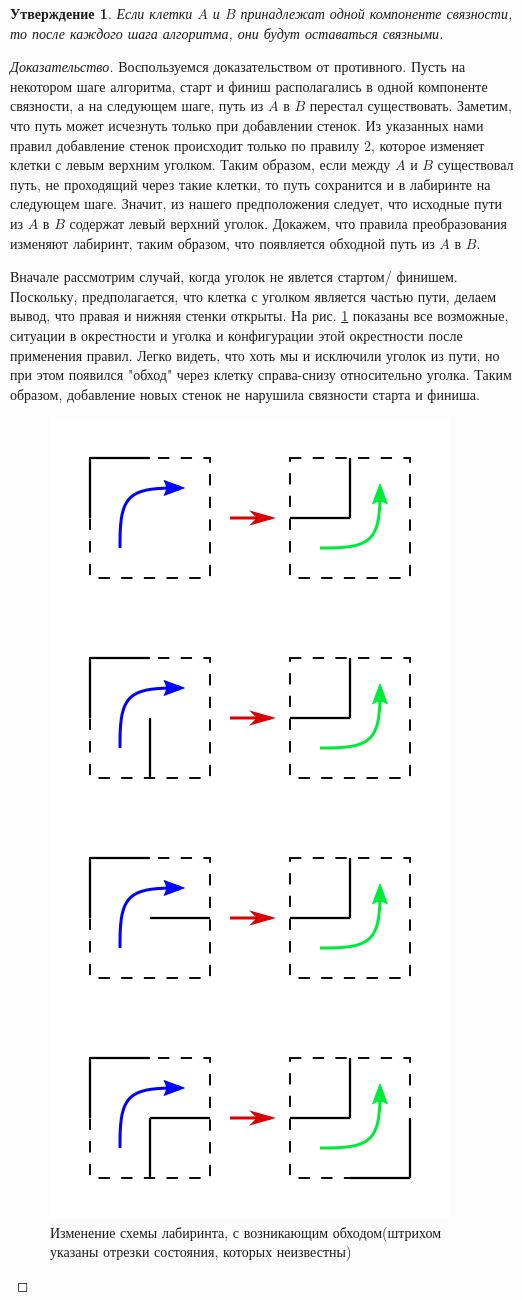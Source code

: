 \documentclass[12pt]{article}
\newtheorem*{claim*}{Утверждение}
\begin{document}
\begin{claim*}
	Если клетки $A$ и $B$ принадлежат одной компоненте связности, то после каждого шага алгоритма, они будут оставаться связными.
\end{claim*}
\begin{proof}[Доказательство]
	Воспользуемся доказательством от противного. Пусть на некотором шаге алгоритма, старт и финиш располагались в одной компоненте связности, а на следующем шаге, путь из $A$ в $B$ перестал существовать. Заметим, что путь может исчезнуть только при добавлении стенок. Из указанных нами правил добавление стенок происходит только по правилу $2$, которое изменяет клетки с левым верхним уголком. Таким образом, если между $A$ и $B$ существовал путь, не проходящий через такие клетки, то путь сохранится и в лабиринте на следующем шаге. Значит, из нашего предположения следует, что исходные пути из $A$ в $B$ содержат левый верхний уголок. Докажем, что правила преобразования изменяют лабиринт, таким образом, что появляется обходной путь из $A$ в $B$.
	
	\bigskip
	
	Вначале рассмотрим случай, когда уголок не явлется стартом/ финишем. Поскольку, предполагается, что клетка с уголком является частью пути, делаем вывод, что правая и нижняя стенки открыты. На рис. \ref{fig:alt_way} показаны все возможные, ситуации в окрестности и уголка и конфигурации этой окрестности после применения правил. Легко видеть, что хоть мы и исключили уголок из пути, но при этом появился "обход" через клетку справа-снизу относительно уголка. Таким образом, добавление новых стенок не нарушила связности старта и финиша.
	
	\begin{figure}[H]
	 	  \centering
          \includegraphics[width=0.25\linewidth]{another_way}
          \caption{Изменение схемы лабиринта, с возникающим обходом(штрихом указаны отрезки состояния, которых неизвестны)}
         \label{fig:alt_way}
     \end{figure}
	

\end{proof}
\end{document}

